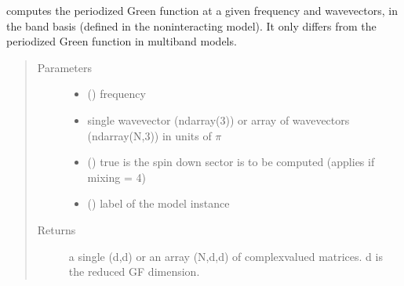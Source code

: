 \documentclass[letterpaper,10pt,english]{sphinxmanual}
\begin{document}
\begin{fulllineitems}
\label{\detokenize{functions:pyqcm.band_Green_function}}
\sphinxAtStartPar
computes the periodized Green function at a given frequency and wavevectors, in the band basis (defined
in the noninteracting model). It only differs from the periodized Green function in multi\sphinxhyphen{}band models.
\begin{quote}\begin{description}
\item[{Parameters}] \leavevmode\begin{itemize}
\item {} 
\sphinxAtStartPar
{} () \textendash{} frequency

\item {} 
\sphinxAtStartPar
{} \textendash{} single wavevector (ndarray(3)) or array of wavevectors (ndarray(N,3)) in units of \(\pi\)

\item {} 
\sphinxAtStartPar
{} () \textendash{} true is the spin down sector is to be computed (applies if mixing = 4)

\item {} 
\sphinxAtStartPar
{} () \textendash{} label of the model instance

\end{itemize}

\item[{Returns}] \leavevmode
\sphinxAtStartPar
a single (d,d) or an array (N,d,d) of complex\sphinxhyphen{}valued matrices. d is the reduced GF dimension.

\end{description}\end{quote}

\end{fulllineitems}
\end{document}
